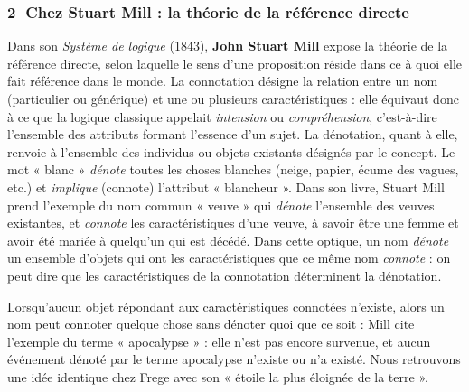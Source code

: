 \subsubsection*{\textcircled{\scriptsize 2} Chez Stuart Mill : la théorie de la référence directe}
Dans son \textit{Système de logique} (1843), \textbf{John Stuart Mill} expose la théorie de la référence directe, selon laquelle le sens d’une proposition réside dans ce à quoi elle fait référence dans le monde. La connotation désigne la relation entre un nom (particulier ou générique) et une ou plusieurs caractéristiques : elle équivaut donc à ce que la logique classique appelait \textit{intension} ou \textit{compréhension}, c’est-à-dire l’ensemble des attributs formant l’essence d’un sujet. La dénotation, quant à elle, renvoie à l’ensemble des individus ou objets existants désignés par le concept. Le mot « blanc » \textit{dénote} toutes les choses blanches (neige, papier, écume des vagues, etc.) et \textit{implique} (connote) l’attribut « blancheur ». Dans son livre, Stuart Mill prend l’exemple du nom commun « veuve » qui \textit{dénote} l’ensemble des veuves existantes, et \textit{connote} les caractéristiques d’une veuve, à savoir être une femme et avoir été mariée à quelqu’un qui est décédé. Dans cette optique, un nom \textit{dénote} un ensemble d’objets qui ont les caractéristiques que ce même nom \textit{connote} : on peut dire que les caractéristiques de la connotation déterminent la dénotation.

Lorsqu’aucun objet répondant aux caractéristiques connotées n’existe, alors un nom peut connoter quelque chose sans dénoter quoi que ce soit : Mill cite l’exemple du terme « apocalypse » : elle n’est pas encore survenue, et aucun événement dénoté par le terme apocalypse n’existe ou n’a existé. Nous retrouvons une idée identique chez Frege avec son « étoile la plus éloignée de la terre ».


